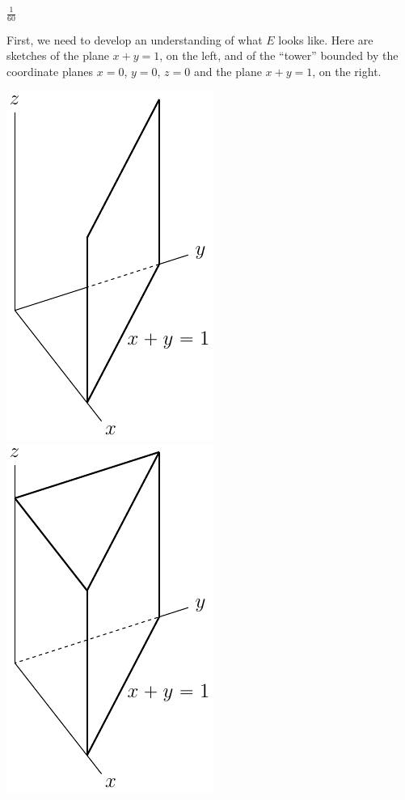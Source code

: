 %

\begin{answer}
$\frac{1}{60}$
\end{answer}

\begin{solution}
First, we need to develop an understanding of what $E$ looks like.
Here are sketches of the plane $x+y=1$, on the left, and of the ``tower''
bounded by the coordinate planes $x=0$, $y=0$, $z=0$ and the
plane $x+y=1$, on the right.
\begin{center}
     \includegraphics{fig/OE12A_8a.pdf}\qquad
     \includegraphics{fig/OE12A_8aa.pdf}

\end{center}
\end{solution}
